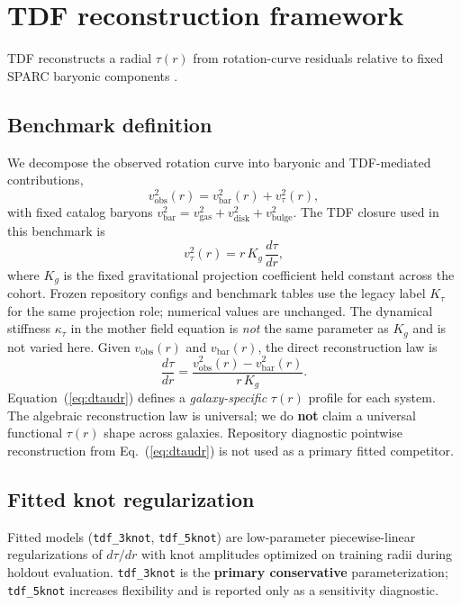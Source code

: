 \documentclass[11pt,a4paper]{article}
\begin{document}
\section{TDF reconstruction framework}
TDF reconstructs a radial $\tau(r)$ from rotation-curve residuals relative to fixed SPARC
baryonic components \cite{lelli2016sparc,mcgaugh2016}.

\subsection{Benchmark definition}
We decompose the observed rotation curve into baryonic and TDF-mediated contributions,
\begin{equation}
  v_{\mathrm{obs}}^2(r) = v_{\mathrm{bar}}^2(r) + v_{\tau}^2(r),
  \label{eq:vobs}
\end{equation}
with fixed catalog baryons $v_{\mathrm{bar}}^2 = v_{\mathrm{gas}}^2 + v_{\mathrm{disk}}^2 + v_{\mathrm{bulge}}^2$.
The TDF closure used in this benchmark is
\begin{equation}
  v_{\tau}^2(r) = r\, K_g\,\frac{d\tau}{dr},
  \label{eq:vtau}
\end{equation}
where $K_g$ is the fixed gravitational projection coefficient held constant across the cohort.
Frozen repository configs and benchmark tables use the legacy label $K_{\tau}$ for the same
projection role; numerical values are unchanged. The dynamical stiffness $\kappa_{\tau}$ in the
mother field equation is \emph{not} the same parameter as $K_g$ and is not varied here.
Given $v_{\mathrm{obs}}(r)$ and $v_{\mathrm{bar}}(r)$, the direct reconstruction law is
\begin{equation}
  \frac{d\tau}{dr} = \frac{v_{\mathrm{obs}}^2(r) - v_{\mathrm{bar}}^2(r)}{r\, K_g}.
  \label{eq:dtaudr}
\end{equation}
Equation~(\ref{eq:dtaudr}) defines a \emph{galaxy-specific} $\tau(r)$ profile for each system.
The algebraic reconstruction law is universal; we do \textbf{not} claim a universal functional
$\tau(r)$ shape across galaxies. Repository diagnostic pointwise reconstruction from
Eq.~(\ref{eq:dtaudr}) is not used as a primary fitted competitor.

\subsection{Fitted knot regularization}
Fitted models (\texttt{tdf\_3knot}, \texttt{tdf\_5knot}) are low-parameter piecewise-linear
regularizations of $d\tau/dr$ with knot amplitudes optimized on training radii during holdout
evaluation. \texttt{tdf\_3knot} is the \textbf{primary conservative} parameterization;
\texttt{tdf\_5knot} increases flexibility and is reported only as a sensitivity diagnostic.
\end{document}
